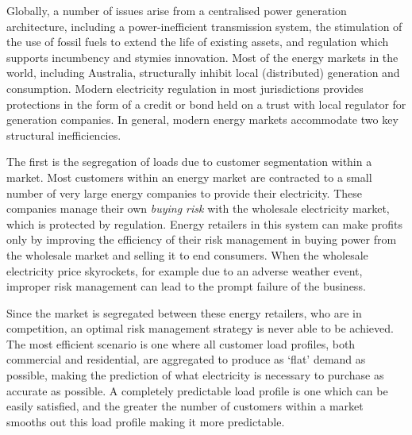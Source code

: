 \documentclass[a4paper,12pt,reqno]{amsart}
\theoremstyle{definition}
\begin{document}
Globally, a number of issues arise from a centralised power generation architecture, including a power-inefficient transmission system, the stimulation of the use of fossil fuels to extend the life of existing assets, and regulation which supports incumbency and stymies innovation. Most of the energy markets in the world, including Australia, structurally inhibit local (distributed) generation and consumption. Modern electricity regulation in most jurisdictions provides protections in the form of a credit or bond held on a trust with local regulator for generation companies. In general, modern energy markets accommodate two key structural inefficiencies. 
% 
% 

The first is the segregation of loads due to customer segmentation within a market. Most customers within an energy market are contracted to a small number of very large energy companies to provide their electricity. These companies manage their own \textit{buying risk} with the wholesale electricity market, which is protected by regulation. Energy retailers in this system can make profits only by improving the efficiency of their risk management in buying power from the wholesale market and selling it to end consumers. When the wholesale electricity price skyrockets, for example due to an adverse weather event, improper risk management can lead to the prompt failure of the business.

Since the market is segregated between these energy retailers, who are in competition, an optimal risk management strategy is never able to be achieved. The most efficient scenario is one where all customer load profiles, both commercial and residential, are aggregated to produce as `flat' demand as possible, making the prediction of what electricity is necessary to purchase as accurate as possible. A completely predictable load profile is one which can be easily satisfied, and the greater the number of customers within a market smooths out this load profile making it more predictable.  

\end{document}

